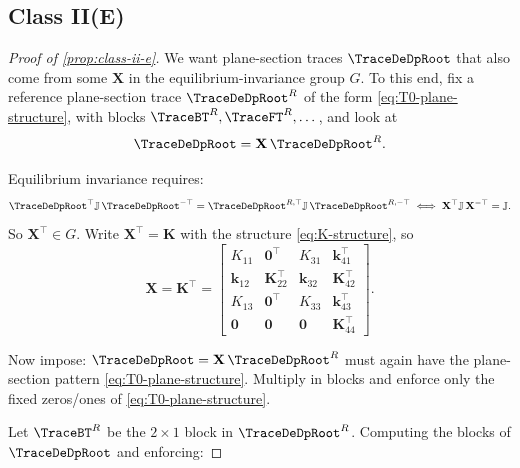 \subsection{Class II(E)}\label{sec:proof-s3}
\begin{proof}[Proof of \cref{prop:class-ii-e}]
We want plane-section traces \(\TraceDeDpRoot\) that also come from some
\(\mathbf{X}\) in the equilibrium-invariance group $G$. 
To this end, fix a reference plane-section trace \(\TraceDeDpRoot^R\) of the form \eqref{eq:T0-plane-structure}, with blocks
\(\TraceBT^R, \TraceFT^R,\dots\), and look at
\begin{equation*}
  \TraceDeDpRoot = \mathbf{X}\,\TraceDeDpRoot^R.
\end{equation*}

Equilibrium invariance requires:
\begin{equation*}
  \TraceDeDpRoot^\top \mathbb{J}\,\TraceDeDpRoot^{-\top}
  = \TraceDeDpRoot^{R,\top} \mathbb{J}\,\TraceDeDpRoot^{R,-\top}
  \;\Longleftrightarrow\;
  \mathbf{X}^\top \mathbb{J}\,\mathbf{X}^{-\top} = \mathbb{J}.
\end{equation*}
So \(\mathbf{X}^\top \in G\).
Write \(\mathbf{X}^\top = \mathbf{K}\) with the structure \eqref{eq:K-structure}, so
\begin{equation}
  \mathbf{X} = \mathbf{K}^\top =
  \begin{bmatrix}
    K_{11}     & \mathbf{0}^\top      & K_{31}      & \bm{k}_{41}^\top \\
    \bm{k}_{12}& \mathbf{K}_{22}^\top & \bm{k}_{32} & \mathbf{K}_{42}^\top \\
    K_{13}     & \mathbf{0}^\top      & K_{33}      & \bm{k}_{43}^\top \\
    \mathbf{0} & \mathbf{0}           & \mathbf{0}  & \mathbf{K}_{44}^\top
  \end{bmatrix}.
  \tag{4}
\end{equation}

Now impose: \(\TraceDeDpRoot = \mathbf{X}\,\TraceDeDpRoot^R\) must again have the
plane-section pattern \eqref{eq:T0-plane-structure}. 
Multiply in blocks and enforce only the fixed
zeros/ones of \eqref{eq:T0-plane-structure}.

Let \(\TraceBT^R\) be the \(2\times 1\) block in \(\TraceDeDpRoot^R\). 
Computing the blocks of \(\TraceDeDpRoot\) and enforcing:


\end{proof}

